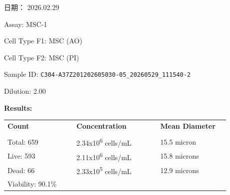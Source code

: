 \documentclass[UTF8,10pt,a4paper,fontset=fandol]{ctexart}
\newcommand{\fieldvalue}[1]{#1}
\newcommand{\handwritten}[1]{#1}
\begin{document}
\hfill
日期：
\fieldvalue{\handwritten{2026.02.29}}

\newpage

\noindent
Assay:
\fieldvalue{MSC-1}

\vspace{0.5em}
\noindent
Cell Type F1:
\fieldvalue{MSC (AO)}

\noindent
Cell Type F2:
\fieldvalue{MSC (PI)}

\vspace{0.5em}
\noindent
Sample ID:
\fieldvalue{\texttt{C304-A37Z201202605030-05\_20260529\_111540-2}}

\noindent
Dilution:
\fieldvalue{2.00}

\vspace{1em}
\noindent
\textbf{Results:}

\vspace{0.5em}
\noindent
\begin{tabular}{@{}p{0.28\linewidth}p{0.34\linewidth}p{0.28\linewidth}@{}}
\textbf{Count} & \textbf{Concentration} & \textbf{Mean Diameter} \\
\underline{\hspace{0.22\linewidth}} &
\underline{\hspace{0.27\linewidth}} &
\underline{\hspace{0.22\linewidth}} \\[0.25em]

Total:
\fieldvalue{659}
&
\fieldvalue{2.34x10\textsuperscript{6} cells/mL}
&
\fieldvalue{15.5 micron}
\\

Live:
\fieldvalue{593}
&
\fieldvalue{2.11x10\textsuperscript{6} cells/mL}
&
\fieldvalue{15.8 microns}
\\

Dead:
\fieldvalue{66}
&
\fieldvalue{2.33x10\textsuperscript{5} cells/mL}
&
\fieldvalue{12.9 microns}
\\

Viability:
\fieldvalue{90.1\%}
&
&
\end{tabular}
\end{document}
